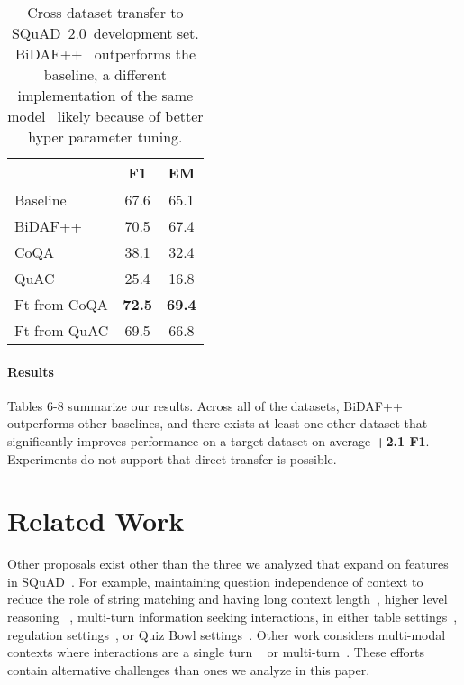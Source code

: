 \documentclass[11pt,a4paper]{article}
\newcommand{\quact}[0]{QuAC}
\newcommand{\coqa}[0]{CoQA}
\newcommand{\squad}[0]{SQuAD~2.0}
\begin{document}
\begin{table}[t]
 \small

    \centering
    \begin{tabular}{l|c|c}
    
     &F1 & EM   \\
    \midrule
    Baseline & 67.6 & 65.1\\
    BiDAF++ & 70.5 & 67.4\\
    \midrule 
    \coqa & 38.1  & 32.4 \\
    \quact & 25.4  & 16.8 \\
    Ft from \coqa & {\bf 72.5} & {\bf 69.4} \\
    Ft from \quact & 69.5 & 66.8\\
    \end{tabular}
    \vspace{-7pt}
    \caption{Cross dataset transfer to \squad~development set. BiDAF++~\cite{ChoiQuAC2018} outperforms the baseline, a different implementation of the same model~\cite{Rajpurkar2018KnowWY} likely because of better hyper parameter tuning.}
        \vspace{-7pt}

    \label{tab:squad2_experiments}
\end{table}

\vspace{-7pt}
\paragraph{Results} Tables 6-8 summarize our results. 
Across all of the datasets, BiDAF++ outperforms other baselines, and there exists at least one other dataset that significantly improves performance on a target dataset on average {\bf +2.1 F1}. 
Experiments do not support that direct transfer is possible.




 \section{Related Work}\label{sec:related}
Other proposals exist other than the three we analyzed that expand on features in SQuAD~\cite{rajpurkar2016squad}. 
For example, maintaining question independence of context to reduce the role of string matching and having long context length~\cite{JoshiTriviaQA2017,Kocisk2017TheNR}, higher level reasoning ~\cite{MultiRC2018,clark2018think,yang2018hotpotqa}, multi-turn information seeking interactions, in either table settings~\cite{IyyerSQA2017,talmor2018web,saha2018complex}, regulation settings~\cite{Saeidi2018QuARC}, or Quiz Bowl settings~\cite{quizbowl}.  
Other work considers multi-modal contexts where interactions are a single turn ~\cite{tapaswi2016movieqa,antol2015vqa,lei2018tvqa} or multi-turn~\cite{das2017visual,pasunuru2018gamebased}.
These efforts contain alternative challenges than ones we analyze in this paper.
\end{document}
